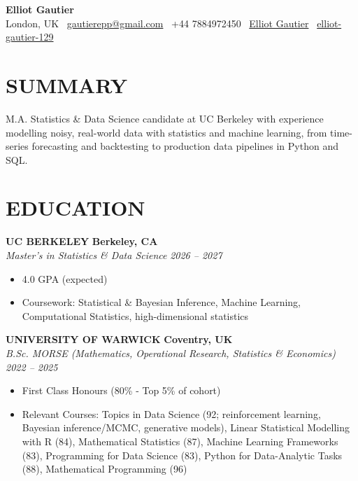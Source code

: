 \documentclass[10pt,a4paper]{article}
\begin{document}

\begin{center}
    {\LARGE \textbf{Elliot Gautier}} \\[3pt]
    London, UK  \quad \textbar{} \quad
    \faEnvelope\
    \href{mailto:gautierepp@gmail.com}{gautierepp@gmail.com}
    \quad \textbar{} \quad
    \faPhone\ +44 7884972450
    \quad \textbar{} \quad
    \faLinkedin\
    \href{www.linkedin.com/in/elliot-gautier-b2aaa3256}{Elliot Gautier}
    \quad \textbar{} \quad
    \faGithub\
    \href{https://github.com/elliot-gautier-129}{elliot-gautier-129}
\end{center}


\section*{SUMMARY}

M.A. Statistics \& Data Science candidate at UC Berkeley with experience modelling noisy, real-world data with statistics and machine learning, from time-series forecasting and backtesting to production data pipelines in Python and SQL.


\section*{EDUCATION}

\textbf{UC BERKELEY} \hfill \textbf{Berkeley, CA}\\
\textit{Master's in Statistics \& Data Science} \hfill \textit{2026 -- 2027}
\begin{itemize}
    \item 4.0 GPA (expected)
    \item Coursework: Statistical \& Bayesian Inference, Machine Learning, Computational Statistics, high-dimensional statistics
\end{itemize}

\textbf{UNIVERSITY OF WARWICK} \hfill \textbf{Coventry, UK}\\
\textit{B.Sc. MORSE (Mathematics, Operational Research, Statistics \& Economics)}
\hfill \textit{2022 -- 2025}
\begin{itemize}
    \item First Class Honours (80\% - Top 5\% of cohort)
    \item Relevant Courses: Topics in Data Science (92; reinforcement learning, Bayesian inference/MCMC, generative models), Linear
Statistical Modelling with R (84), Mathematical Statistics (87), Machine Learning Frameworks (83), Programming for Data
Science (83), Python for Data-Analytic Tasks (88), Mathematical Programming (96)
\end{itemize}
\end{document}
